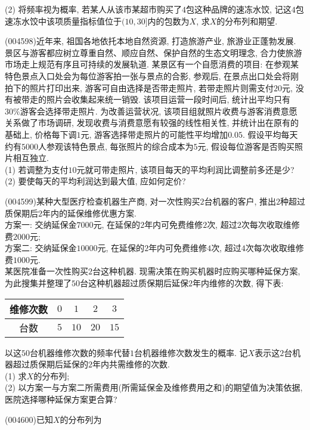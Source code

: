 (2) 将频率视为概率, 若某人从该市某超市购买了$4$包这种品牌的速冻水饺, 记这$4$包速冻水饺中该项质量指标值位于$(10,30]$内的包数为$X$, 求$X$的分布列和期望.
\item (004598)近年来, 祖国各地依托本地自然资源, 打造旅游产业, 旅游业正蓬勃发展. 景区与游客都应树立尊重自然、顺应自然、保护自然的生态文明理念, 合力使旅游市场走上规范有序且可持续的发展轨道. 某景区有一个自愿消费的项目: 在参观某特色景点入口处会为每位游客拍一张与景点的合影, 参观后, 在景点出口处会将刚拍下的照片打印出来, 游客可自由选择是否带走照片, 若带走照片则需支付$20$元, 没有被带走的照片会收集起来统一销毁. 该项目运营一段时间后, 统计出平均只有$30\%$游客会选择带走照片. 为改善运营状况, 该项目组就照片收费与游客消费意愿关系做了市场调研, 发现收费与消费意愿有较强的线性相关性, 并统计出在原有的基础上, 价格每下调$1$元, 游客选择带走照片的可能性平均增加$0.05$. 假设平均每天约有$5000$人参观该特色景点, 每张照片的综合成本为$5$元, 假设每位游客是否购买照片相互独立.\\
(1) 若调整为支付$10$元就可带走照片, 该项目每天的平均利润比调整前多还是少?\\
(2) 要使每天的平均利润达到最大值, 应如何定价?
\item (004599)某种大型医疗检查机器生产商, 对一次性购买$2$台机器的客户, 推出$2$种超过质保期后$2$年内的延保维修优惠方案.\\
方案一: 交纳延保金$7000$元, 在延保的$2$年内可免费维修$2$次, 超过$2$次每次收取维修费$2000$元;\\
方案二: 交纳延保金$10000$元, 在延保的$2$年内可免费维修$4$次, 超过$4$次每次收取维修费$1000$元.\\
某医院准备一次性购买$2$台这种机器. 现需决策在购买机器时应购买哪种延保方案, 为此搜集并整理了$50$台这种机器超过质保期后延保$2$年内维修的次数, 得下表:
\begin{center}
    \begin{tabular}{|c|c|c|c|c|}
        \hline
        维修次数 & $0$ & $1$ & $2$ & $3$\\ \hline
        台数 & $5$ & $10$ & $20$ & $15$\\ \hline
    \end{tabular}
\end{center}
以这$50$台机器维修次数的频率代替$1$台机器维修次数发生的概率. 记$X$表示这$2$台机器超过质保期后延保的$2$年内共需维修的次数.\\
(1) 求$X$的分布列;\\
(2) 以方案一与方案二所需费用(所需延保金及维修费用之和)的期望值为决策依据, 医院选择哪种延保方案更合算?
\item (004600)已知$X$的分布列为
